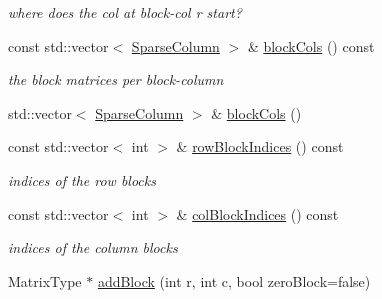 \begin{DoxyCompactItemize}
\begin{DoxyCompactList}\small\item\em where does the col at block-\/col r start? \end{DoxyCompactList}\item 
const std\+::vector$<$ \mbox{\hyperlink{classg2o_1_1_sparse_block_matrix_hash_map_ae364a722296b90e32dd6c3a8fbeb49ae}{Sparse\+Column}} $>$ \& \mbox{\hyperlink{classg2o_1_1_sparse_block_matrix_hash_map_a07d4746ccda502bd815a09aefe42eac6}{block\+Cols}} () const
\begin{DoxyCompactList}\small\item\em the block matrices per block-\/column \end{DoxyCompactList}\item 
std\+::vector$<$ \mbox{\hyperlink{classg2o_1_1_sparse_block_matrix_hash_map_ae364a722296b90e32dd6c3a8fbeb49ae}{Sparse\+Column}} $>$ \& \mbox{\hyperlink{classg2o_1_1_sparse_block_matrix_hash_map_a2879ea0d9b530e7c522c912dff279b5d}{block\+Cols}} ()
\item 
const std\+::vector$<$ int $>$ \& \mbox{\hyperlink{classg2o_1_1_sparse_block_matrix_hash_map_a0175c628d15ff70edbcfc843639b66ae}{row\+Block\+Indices}} () const
\begin{DoxyCompactList}\small\item\em indices of the row blocks \end{DoxyCompactList}\item 
const std\+::vector$<$ int $>$ \& \mbox{\hyperlink{classg2o_1_1_sparse_block_matrix_hash_map_af52ca00195dd79b48ba066f6adcbc17e}{col\+Block\+Indices}} () const
\begin{DoxyCompactList}\small\item\em indices of the column blocks \end{DoxyCompactList}\item 
Matrix\+Type $\ast$ \mbox{\hyperlink{classg2o_1_1_sparse_block_matrix_hash_map_a08330c47b1b60bbe008e3c4ee2f5150f}{add\+Block}} (int r, int c, bool zero\+Block=false)
\end{DoxyCompactItemize}
